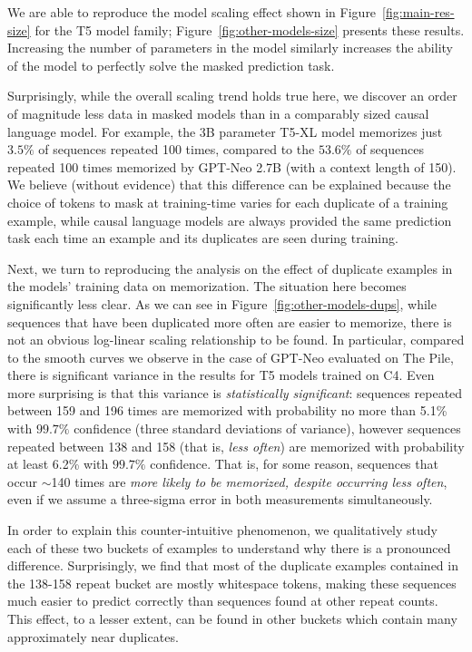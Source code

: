 %
We are able to reproduce the model scaling effect shown in Figure~\ref{fig:main-res-size} for the T5 model family;
Figure~\ref{fig:other-models-size} presents these results.
%
Increasing the number of parameters in the model similarly increases the ability of the model
to perfectly solve the masked prediction task.

Surprisingly, while the overall scaling trend holds true here, we discover an order of magnitude less data in masked models than in a comparably
sized causal language model.
%
For example, the $3$B parameter T5-XL model memorizes just $3.5\%$ of sequences repeated 100 times, compared to the $53.6\%$ of sequences repeated 100 times memorized by GPT-Neo 2.7B (with a context length of 150). 
We believe (without evidence) that this difference can be explained because the choice of tokens to mask at training-time varies for each duplicate of a training example, while causal language models are always provided the same prediction task each time an example and its duplicates are seen during training.

Next, we turn to reproducing the analysis on the effect of duplicate examples in the models' training data on memorization.
%
The situation here becomes significantly less clear.
%
As we can see in Figure~\ref{fig:other-models-dups}, while sequences that have been duplicated more often are easier to memorize,
there is not an obvious log-linear scaling relationship to be found.
%
In particular, compared to the smooth curves we observe in the case of GPT-Neo evaluated on The Pile,
there is significant variance in the results for T5 models trained on C4.
%
Even more surprising is that this variance is \emph{statistically significant}:
sequences repeated between 159 and 196 times are memorized with probability no more than 5.1\% with $99.7\%$ confidence (three standard deviations of variance),
however sequences repeated between 138 and 158 (that is, \emph{less often}) are memorized with probability
at least 6.2\% with $99.7\%$ confidence.
%
That is, for some reason, sequences that occur $\sim$140 times are \emph{more likely to be memorized, despite occurring less often}, even if we assume a three-sigma error in both measurements simultaneously.

In order to explain this counter-intuitive phenomenon, we qualitatively study each of these two buckets
of examples to understand why there is a pronounced difference.
%
Surprisingly, we find that most of the duplicate examples contained in the 138-158 repeat bucket are mostly whitespace tokens, making these sequences much easier to predict correctly than sequences found at other repeat counts.
This effect, to a lesser extent, can be found in other buckets which contain many approximately near duplicates.

